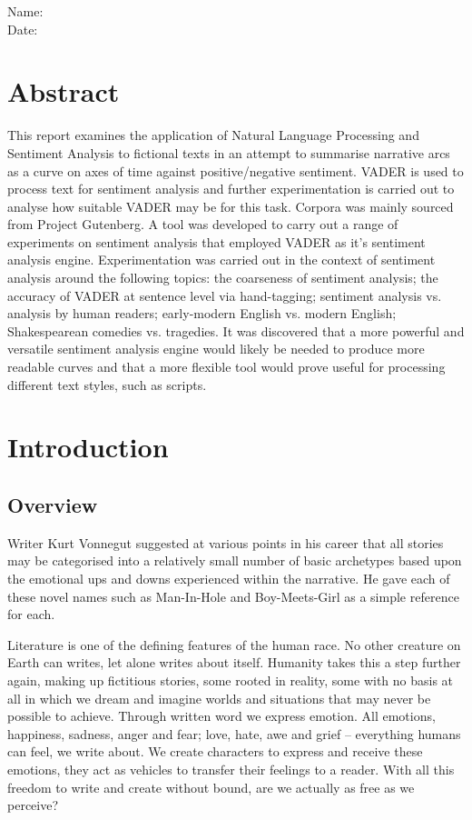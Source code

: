 \documentclass{article}
\begin{document}
    \noindent
    Name: \\
    Date:
\newpage
\section*{Abstract}
    This report examines the application of Natural Language Processing and Sentiment Analysis to fictional texts in an attempt to summarise narrative arcs as a curve on axes of time against positive/negative sentiment. VADER is used to process text for sentiment analysis and further experimentation is carried out to analyse how suitable VADER may be for this task. Corpora was mainly sourced from Project Gutenberg. A tool was developed to carry out a range of experiments on sentiment analysis that employed VADER as it's sentiment analysis engine. Experimentation was carried out in the context of sentiment analysis around the following topics: the coarseness of sentiment analysis; the accuracy of VADER at sentence level via hand-tagging; sentiment analysis vs. analysis by human readers; early-modern English vs. modern English; Shakespearean comedies vs. tragedies. It was discovered that a more powerful and versatile sentiment analysis engine would likely be needed to produce more readable curves and that a more flexible tool would prove useful for processing different text styles, such as scripts.
\newpage
\tableofcontents
\newpage
\section{Introduction}
    \subsection{Overview}
        Writer Kurt Vonnegut suggested at various points in his career that all stories may be categorised into a relatively small number of basic archetypes based upon the emotional ups and downs experienced within the narrative. He gave each of these novel names such as Man-In-Hole and Boy-Meets-Girl as a simple reference for each. \cite{vonnegutLecture}

        Literature is one of the defining features of the human race. No other creature on Earth can writes, let alone writes about itself. Humanity takes this a step further again, making up fictitious stories, some rooted in reality, some with no basis at all in which we dream and imagine worlds and situations that may never be possible to achieve. Through written word we express emotion. All emotions, happiness, sadness, anger and fear; love, hate, awe and grief – everything humans can feel, we write about. We create characters to express and receive these emotions, they act as vehicles to transfer their feelings to a reader. With all this freedom to write and create without bound, are we actually as free as we perceive?
\end{document}
